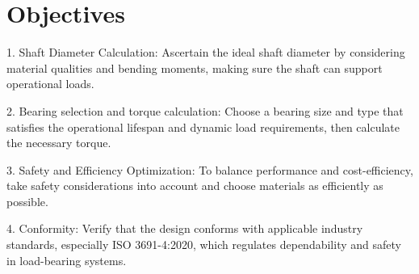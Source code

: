 \documentclass[../../main]{subfiles}
\begin{document}




\section{Objectives}

1. Shaft Diameter Calculation: Ascertain the ideal shaft diameter by
considering material qualities and bending moments, making sure the
shaft can support operational loads.

2. Bearing selection and torque calculation: Choose a bearing size and
type that satisfies the operational lifespan and dynamic load
requirements, then calculate the necessary torque.

3. Safety and Efficiency Optimization: To balance performance and
cost-efficiency, take safety considerations into account and choose
materials as efficiently as possible.

4. Conformity: Verify that the design conforms with applicable industry
standards, especially ISO 3691-4:2020, which regulates dependability and
safety in load-bearing systems.
\end{document}
